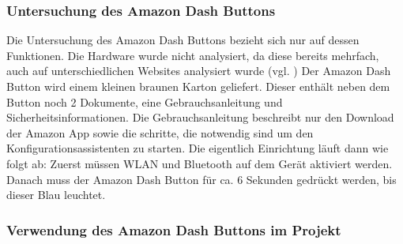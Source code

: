 \subsubsection{Untersuchung des Amazon Dash Buttons}
\label{sec:Untersuchung des Amazon Dash Buttons}
Die Untersuchung des Amazon Dash Buttons bezieht sich nur auf dessen Funktionen.
Die Hardware wurde nicht analysiert, da diese bereits mehrfach, auch auf unterschiedlichen Websites analysiert wurde (vgl. \cite{.17.05.2017}\cite{.17.05.2017b})
Der Amazon Dash Button wird einem kleinen braunen Karton geliefert.
Dieser enthält neben dem Button noch 2 Dokumente, eine Gebrauchsanleitung und Sicherheitsinformationen.
Die Gebrauchsanleitung beschreibt nur den Download der Amazon App sowie die schritte, die notwendig sind um den Konfigurationsassistenten zu starten.
Die eigentlich Einrichtung läuft dann wie folgt ab:
Zuerst müssen WLAN und Bluetooth auf dem Gerät aktiviert werden.
Danach muss der Amazon Dash Button für ca. 6 Sekunden gedrückt werden, bis dieser Blau leuchtet.

\subsubsection{Verwendung des Amazon Dash Buttons im Projekt}
\label{sec:Verwendung des Amazon Dash Buttons im Projekt}
